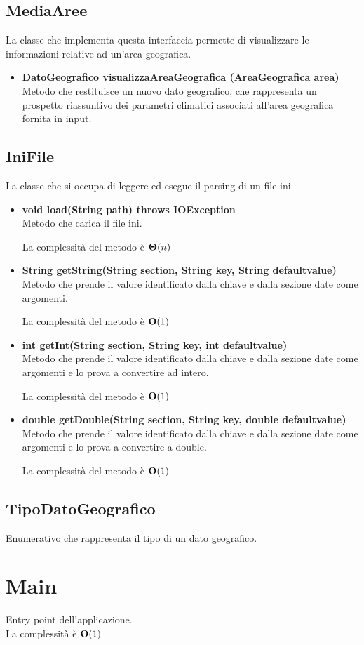 \documentclass[a4paper, 12pt]{scrreprt}
\begin{document}
			\subsection{MediaAree}
			La classe che implementa questa interfaccia permette di visualizzare le informazioni relative ad un'area geografica.
			\begin{itemize}
				\item\textbf {DatoGeografico visualizzaAreaGeografica (AreaGeografica area)}
				\\Metodo che restituisce un nuovo dato geografico, che rappresenta un prospetto riassuntivo dei parametri climatici associati all'area geografica fornita in input.
			\end{itemize}
			\subsection{IniFile}
			La classe che si occupa di leggere ed esegue il parsing di un file ini.
			\begin{itemize}
				\item \textbf{void load(String path) throws IOException}
				\\Metodo che carica il file ini.
				
				La complessità del metodo è $\mathbf{\Theta}(n)$
				
				\item \textbf{String getString(String section, String key, String defaultvalue)}
				\\Metodo che prende il valore identificato dalla chiave e dalla sezione date come argomenti.
				
				La complessità del metodo è $\mathbf{O}(1)$
				
				\item \textbf{int getInt(String section, String key, int defaultvalue)}
				\\Metodo che prende il valore identificato dalla chiave e dalla sezione date come argomenti e lo prova a convertire ad intero.
				
				La complessità del metodo è $\mathbf{O}(1)$
				
				\item \textbf{double getDouble(String section, String key, double defaultvalue)}
				\\Metodo che prende il valore identificato dalla chiave e dalla sezione date come argomenti e lo prova a convertire a double.
				
				La complessità del metodo è $\mathbf{O}(1)$
				
				
			\end{itemize}
			\subsection{TipoDatoGeografico}
			Enumerativo che rappresenta il tipo di un dato geografico.


		\section{Main}
		Entry point dell'applicazione.\\
		La complessità è $\mathbf{O}(1)$

	\nocite{IuriTex}
	
	
	\printindex
\end{document}

